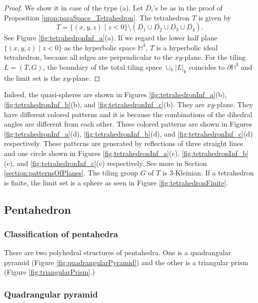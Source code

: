 \documentclass[suppldata, dvipdfmx]{interact}
\theoremstyle{plain}%
\theoremstyle{definition}
\theoremstyle{remark}
\theoremstyle{problemstyle}
\begin{document}
\begin{proof}
We show it in case of the type (a).  Let $\overline{D_i}$'s be as in the proof of Proposition \ref{prop:paraSpace_Tetrahedron}.  The tetrahedron $T$ is given by 
\[
T = \{(x,y,z) \mid z<0\} \setminus(\overline{D_1} \cup \overline{D_2} \cup \overline{D_3} \cup \overline{D_4}).
\]
See Figure \ref{fig:tetrahedronInf_a}(a).  If we regard the lower half plane $\{(x,y,z) \mid z<0\}$ as the hyperbolic space $\mathbb{H}^3$, $T$ is a hyperbolic ideal tetrahedron, because all edges are perpendicular to the $xy$-plane.  For the tiling $L=(T,G)$, the boundary of the total tiling space $\cup_k |L|_k$
coincides to $\partial{\mathbb{H}^3}$ and the limit set is the $xy$-plane.
\end{proof}

Indeed, the quasi-spheres are shown in Figures \ref{fig:tetrahedronInf_a}(b), \ref{fig:tetrahedronInf_b}(b),
and \ref{fig:tetrahedronInf_c}(b).  They are $xy$-plane.  They have different colored patterns and it is because the combinations of the dihedral angles are different from each other.  These colored patterns are shown in Figures  \ref{fig:tetrahedronInf_a}(d), \ref{fig:tetrahedronInf_b}(d),
and \ref{fig:tetrahedronInf_c}(d) respectively.  These patterns are generated by reflections of three straight lines and one circle shown in Figures \ref{fig:tetrahedronInf_a}(c), \ref{fig:tetrahedronInf_b}(c),
and \ref{fig:tetrahedronInf_c}(c) respectively.  See more in Section \ref{section:patternsOfPlanes}. The tiling group $G$ of $T$ is 3-Kleinian.  If a tetrahedron is finite, the limit set is a sphere as seen in Figure \ref{fig:tetrahedronFinite}.

\subsection{Pentahedron}

\subsubsection{Classification of pentahedra}

There are two polyhedral structures of pentahedra. One is a quadrangular pyramid (Figure \ref{fig:quadrangularPyramid}) and the other is a triangular prism (Figure \ref{fig:triangularPrism}.)

\subsubsection{Quadrangular pyramid}
\end{document}
